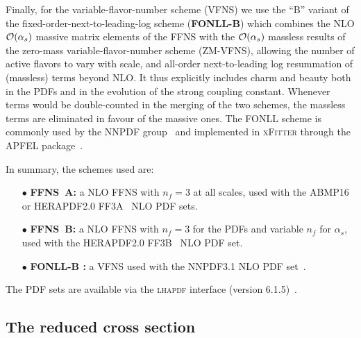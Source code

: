 \documentclass[pdftex,twocolumn,epjc3]{svjour3}          %
\newcommand{\abmp} {ABMP16\xspace}
\newcommand{\nnpdf} {NNPDF3.1\xspace}
\newcommand{\xfitter} {\textsc{xFitter}\xspace}
\newcommand{\lhapdf} {{\textsc{lhapdf}}\xspace}
\newcommand{\ffns} {{FFNS~A}\xspace}
\newcommand{\ffnsb} {{FFNS~B}\xspace}
\newcommand{\ffthreea} {{\hbox{HERAPDF2.0} FF3A}\xspace}
\newcommand{\ffthreeb} {{\hbox{HERAPDF2.0} FF3B}\xspace}
\begin{document}
Finally, for the variable-flavor-number scheme (VFNS) we use the ``B''
variant of the fixed-order-next-to-leading-log scheme ({\bf FONLL-B})
which combines the NLO ${\cal O}(\alpha_s)$ massive matrix elements of
the FFNS with the ${\cal O}(\alpha_s)$ massless results of the
zero-mass variable-flavor-number scheme (ZM-VFNS), allowing the number
of active flavors to vary with scale, and all-order next-to-leading
log resummation of (massless) terms beyond NLO.  It thus explicitly
includes charm and beauty both in the PDFs and in the evolution of the
strong coupling constant.  Whenever terms would be double-counted in
the merging of the two schemes, the massless terms are eliminated in
favour of the massive ones. The FONLL scheme is commonly used by the
NNPDF group~\cite{Ball:2017nwa} and implemented in \xfitter through
the APFEL package~\cite{Bertone:2013vaa}.

In summary, the schemes used are:
\begin{itemize}
  \setlength\itemsep{1em}

\item[$\bullet$] {\bf \ffns :} a NLO FFNS with $n_f = 3$ at all
  scales, used with the \abmp~\cite{Alekhin:2018pai} or
  \ffthreea~\cite{Abramowicz:2015mha} NLO PDF sets.

\item[$\bullet$] {\bf \ffnsb :} a NLO FFNS with $n_f = 3$ for the PDFs
  and variable $n_f$ for $\alpha_s$, used with the
  \ffthreeb~\cite{Abramowicz:2015mha} NLO PDF set.

\item[$\bullet$] {\bf FONLL-B :} a VFNS used with the \nnpdf NLO PDF
  set~\cite{Ball:2017nwa}.
\end{itemize}
The PDF sets are available via the \lhapdf interface (version
6.1.5)~\cite{Buckley:2014ana}.

\subsection{The reduced cross section}\label{sec-redsigma}
\end{document}
